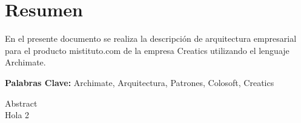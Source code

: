\chapter*{Resumen}
\label{sec:resumen}
\vspace*{-10mm}
En el presente documento se realiza la descripción de arquitectura empresarial para el producto mistituto.com de la empresa Creatics utilizando el lenguaje Archimate.

{\large\textbf{Palabras Clave:}}
Archimate, Arquitectura, Patrones, Colosoft, Creatics

\vspace*{20mm}
{Abstract}
\label{sec:abstract} \\
Hola 2